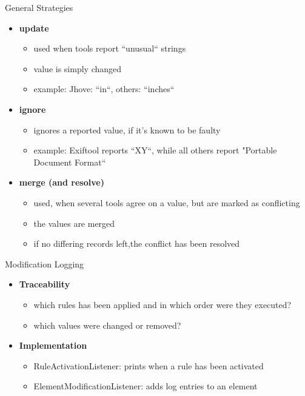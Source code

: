 \documentclass{beamer}
\begin{document}
\begin{frame}{General Strategies}

   \begin{itemize}
   \item \textbf{update}
   \begin{itemize}
	   \item used when tools report ``unusual`` strings
	   \item value is simply changed
	   \item example: Jhove: ``in``, others: ``inches``
   \end{itemize}
   \item \textbf{ignore}
   \begin{itemize}
   		\item ignores a reported value, if it's known to be faulty
   		\item example: Exiftool reports ``XY``, while all others report "Portable Document Format``
   \end{itemize}
   \item \textbf{merge (and resolve)} 
   \begin{itemize}
   		\item used, when several tools agree on a value, but are marked as conflicting
   		\item the values are merged
   		\item if no differing records left,the conflict has been resolved
   \end{itemize}
   \end{itemize}
  
\note{

}
\end{frame}

\begin{frame}{Modification Logging}

   \begin{itemize}
   \item \textbf{Traceability}
   \begin{itemize}
	   \item which rules has been applied and in which order were they executed?
	   \item which values were changed or removed?
   \end{itemize}
   \item \textbf{Implementation}
   \begin{itemize}
   		\item RuleActivationListener: prints when a rule has been activated
   		\item ElementModificationListener: adds log entries to an element
   \end{itemize}
   \end{itemize}
  
\note{

}
\end{frame}
\end{document}

